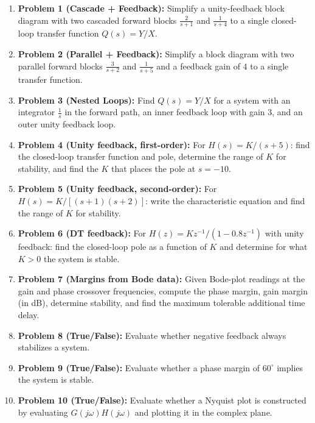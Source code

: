 \documentclass[11pt]{article}
\begin{document}
\begin{enumerate}
  \item \textbf{Problem 1 (Cascade + Feedback):} Simplify a unity-feedback block diagram with two cascaded forward blocks $\tfrac{2}{s+1}$ and $\tfrac{1}{s+4}$ to a single closed-loop transfer function $Q(s) = Y/X$.
  \item \textbf{Problem 2 (Parallel + Feedback):} Simplify a block diagram with two parallel forward blocks $\tfrac{3}{s+2}$ and $\tfrac{1}{s+5}$ and a feedback gain of $4$ to a single transfer function.
  \item \textbf{Problem 3 (Nested Loops):} Find $Q(s) = Y/X$ for a system with an integrator $\tfrac{1}{s}$ in the forward path, an inner feedback loop with gain $3$, and an outer unity feedback loop.
  \item \textbf{Problem 4 (Unity feedback, first-order):} For $H(s) = K/(s+5)$: find the closed-loop transfer function and pole, determine the range of $K$ for stability, and find the $K$ that places the pole at $s = -10$.
  \item \textbf{Problem 5 (Unity feedback, second-order):} For $H(s) = K/[(s+1)(s+2)]$: write the characteristic equation and find the range of $K$ for stability.
  \item \textbf{Problem 6 (DT feedback):} For $H(z) = Kz^{-1}/(1 - 0.8z^{-1})$ with unity feedback: find the closed-loop pole as a function of $K$ and determine for what $K > 0$ the system is stable.
  \item \textbf{Problem 7 (Margins from Bode data):} Given Bode-plot readings at the gain and phase crossover frequencies, compute the phase margin, gain margin (in dB), determine stability, and find the maximum tolerable additional time delay.
  \item \textbf{Problem 8 (True/False):} Evaluate whether negative feedback always stabilizes a system.
  \item \textbf{Problem 9 (True/False):} Evaluate whether a phase margin of $60^\circ$ implies the system is stable.
  \item \textbf{Problem 10 (True/False):} Evaluate whether a Nyquist plot is constructed by evaluating $G(j\omega)H(j\omega)$ and plotting it in the complex plane.
\end{enumerate}
\end{document}
